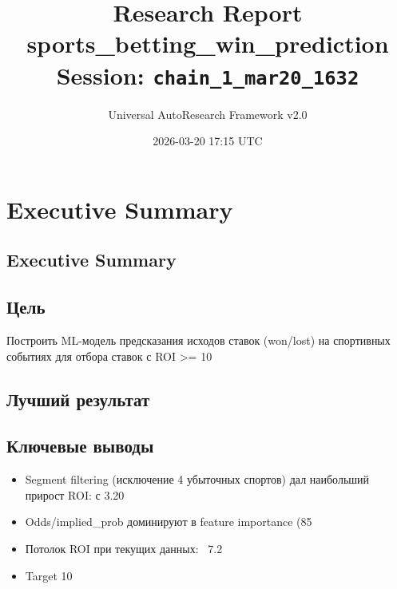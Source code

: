 \documentclass[12pt,a4paper]{article}
\title{
    \Large\textbf{Research Report}\\[0.5em]
    \large sports\_betting\_win\_prediction\\[0.3em]
    \normalsize Session: \texttt{chain\_1\_mar20\_1632}
}
\author{Universal AutoResearch Framework v2.0}
\date{2026-03-20 17:15 UTC}
\begin{document}
\maketitle
\tableofcontents
\newpage


\section{Executive Summary}

\subsection{Executive Summary}

\subsection{Цель}
Построить ML-модель предсказания исходов ставок (won/lost) на спортивных событиях для отбора ставок с ROI >= 10%

\subsection{Лучший результат}

\subsection{Ключевые выводы}
\begin{itemize}
  \item Segment filtering (исключение 4 убыточных спортов) дал наибольший прирост ROI: с 3.20%
  \item Odds/implied_prob доминируют в feature importance (85%
  \item Потолок ROI при текущих данных: ~7.2%
  \item Target 10%
\end{itemize}
\end{document}
